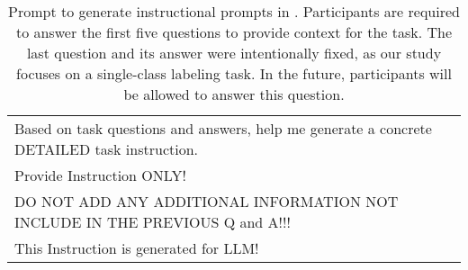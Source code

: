 \begin{table*}[h]
\begin{tabular}{@{}p{\textwidth}@{}}
        \\
        Based on task questions and answers, help me generate a concrete DETAILED task instruction.\\
        Provide Instruction ONLY!\\
        DO NOT ADD ANY ADDITIONAL INFORMATION NOT INCLUDE IN THE PREVIOUS Q and A!!!\\
        This Instruction is generated for LLM!\\
        \hline
    \end{tabular}
    \caption{Prompt to generate instructional prompts in \system. Participants are required to answer the first five questions to provide context for the task. The last question and its answer were intentionally fixed, as our study focuses on a single-class labeling task. In the future, participants will be allowed to answer this question.}
    \label{tab:instruction-prompt}
\end{table*}

